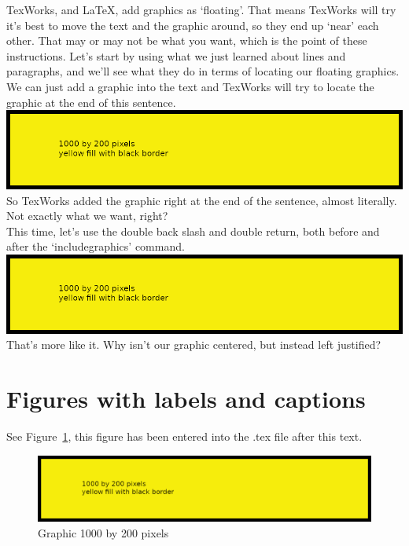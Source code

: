 TexWorks, and LaTeX, add graphics as `floating'.  That means TexWorks will try it's best to move the text and the graphic around, so they end up `near' each other. That may or may not be what you want, which is the point of these instructions. Let's start by using what we just learned about lines and paragraphs, and we'll see what they do in terms of locating our floating graphics.  We can just add a graphic into the text and TexWorks will try to locate the graphic at the end of this sentence. \includegraphics{1000x200} So TexWorks added the graphic right at the end of the sentence, almost literally.  Not exactly what we want, right?\\

This time, let's use the double back slash and double return, both before and after the `includegraphics' command.\\

\includegraphics{1000x200}\\ %

That's more like it.  Why isn't our graphic centered, but instead left justified?

\section{Figures with labels and captions}

See Figure~\ref{fg:1000x200}, this figure has been entered into the .tex file after this text.  

\begin{figure}[H]
\centering
\includegraphics{1000x200}
\caption{Graphic 1000 by 200 pixels}\label{fg:1000x200}
\end{figure}

